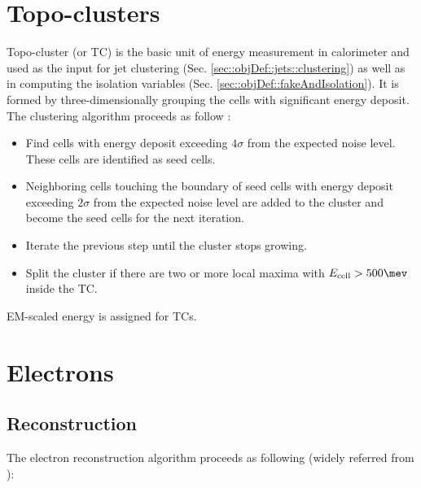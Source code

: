 \section{Topo-clusters} \label{sec::objDef::TopoCluster}
Topo-cluster (or TC) is the basic unit of energy measurement in calorimeter and used as the input for jet clustering  (Sec. \ref{sec::objDef::jets::clustering}) as well as in computing the isolation variables (Sec. \ref{sec::objDef::fakeAndIsolation}). 
It is formed by three-dimensionally grouping the cells with significant energy deposit.
The clustering algorithm proceeds as follow \cite{138_topoClustering_Run1}:
\begin{itemize}
\item Find cells with energy deposit exceeding $4\sigma$ from the expected noise level. These cells are identified as seed cells.
\item Neighboring cells touching the boundary of seed cells with energy deposit exceeding $2\sigma$ from the expected noise level are added to the cluster and become the seed cells for the next iteration.
\item Iterate the previous step until the cluster stops growing.
\item Split the cluster if there are two or more local maxima with $E_{\mathrm{cell}}>500\mev$ inside the TC.
\end{itemize}
EM-scaled energy is assigned for TCs. \\



\clearpage
\section{Electrons} \label{sec::objDef::electrons}

\subsection{Reconstruction} \label{sec::objDef::electrons::reco}
The electron reconstruction algorithm proceeds as following (widely referred from \cite{156_ElectronEffMeas_2015data}): 

